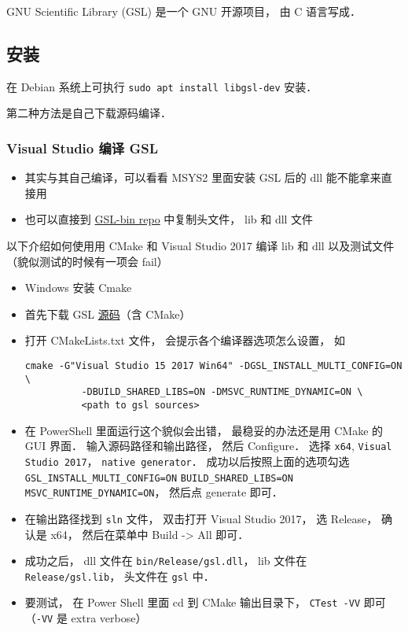 
\begin{issues}
\issueDraft
\issueMissDepend
\end{issues}

GNU Scientific Library (GSL) 是一个 GNU 开源项目， 由 C 语言写成．

\subsection{安装}
在 Debian 系统上可执行 \verb|sudo apt install libgsl-dev| 安装．

第二种方法是自己下载源码编译．

\subsubsection{Visual Studio 编译 GSL}
\begin{itemize}
\item 其实与其自己编译，可以看看 MSYS2 里面安装 GSL 后的 dll 能不能拿来直接用
\item 也可以直接到 \href{https://github.com/MacroUniverse/GSL-bin}{GSL-bin repo} 中复制头文件， lib 和 dll 文件
\end{itemize}

以下介绍如何使用用 CMake 和 Visual Studio 2017 编译 lib 和 dll 以及测试文件（貌似测试的时候有一项会 fail）

\begin{itemize}
\item Windows 安装 Cmake
\item 首先下载 GSL \href{https://github.com/ampl/gsl}{源码}（含 CMake）
\item 打开 CMakeLists.txt 文件， 会提示各个编译器选项怎么设置， 如
\begin{lstlisting}[language=none]
    cmake -G"Visual Studio 15 2017 Win64" -DGSL_INSTALL_MULTI_CONFIG=ON \
          -DBUILD_SHARED_LIBS=ON -DMSVC_RUNTIME_DYNAMIC=ON \
          <path to gsl sources>
\end{lstlisting}
\item 在 PowerShell 里面运行这个貌似会出错， 最稳妥的办法还是用 CMake 的 GUI 界面． 输入源码路径和输出路径， 然后 Configure． 选择 \verb`x64`, \verb`Visual Studio 2017`， \verb`native generator`． 成功以后按照上面的选项勾选 \verb`GSL_INSTALL_MULTI_CONFIG=ON` \verb`BUILD_SHARED_LIBS=ON` \verb`MSVC_RUNTIME_DYNAMIC=ON`， 然后点 generate 即可．
\item 在输出路径找到 \verb`sln` 文件， 双击打开 Visual Studio 2017， 选 Release， 确认是 x64， 然后在菜单中 Build -> All 即可．

\item 成功之后， dll 文件在 \verb`bin/Release/gsl.dll`， lib 文件在 \verb`Release/gsl.lib`， 头文件在 \verb`gsl` 中．
\item 要测试， 在 Power Shell 里面 cd 到 CMake 输出目录下， \verb`CTest -VV` 即可 （\verb`-VV` 是 extra verbose）
\end{itemize}



